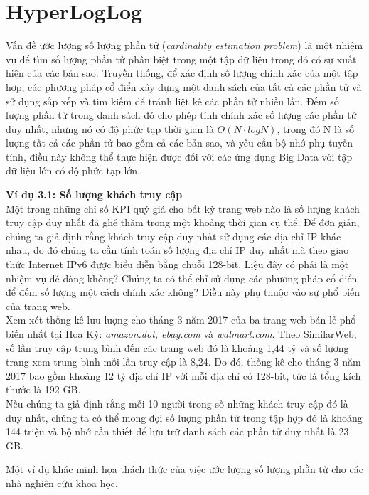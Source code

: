 \documentclass[a4paper,13pt]{article}
\theoremstyle{mytheor}
\begin{document}
\section{HyperLogLog}
Vấn đề ước lượng số lượng phần tử (\textit{cardinality estimation problem}) là một nhiệm vụ để tìm số lượng phần tử phân biệt 
trong một tập dữ liệu trong đó có sự xuất hiện của các bản sao. Truyền thống, 
để xác định số lượng chính xác của một tập hợp, các phương pháp cổ điển xây dựng 
một danh sách của tất cả các phần tử và sử dụng sắp xếp và tìm kiếm để tránh liệt kê 
các phần tử nhiều lần. Đếm số lượng phần tử trong danh sách đó cho phép tính chính xác 
số lượng các phần tử duy nhất, nhưng nó có độ phức tạp thời gian là $O(N\cdot logN)$, 
trong đó N là số lượng tất cả các phần tử bao gồm cả các bản sao, và yêu cầu 
bộ nhớ phụ tuyến tính, điều này không thể thực hiện được đối với các ứng dụng 
Big Data với tập dữ liệu lớn có độ phức tạp lớn.
\begin{mdframed}
   \textbf{Ví dụ 3.1: Số lượng khách truy cập}\\
    Một trong những chỉ số KPI quý giá cho bất kỳ trang web nào là số lượng khách truy cập duy nhất đã ghé thăm trong một khoảng thời gian cụ thể. 
    Để đơn giản, chúng ta giả định rằng khách truy cập duy nhất sử dụng các địa chỉ IP khác nhau, do đó chúng ta cần tính toán số lượng địa chỉ IP 
    duy nhất mà theo giao thức Internet IPv6 được biểu diễn bằng chuỗi 128-bit. Liệu đây có phải là một nhiệm vụ dễ dàng không? 
    Chúng ta có thể chỉ sử dụng các phương pháp cổ điển để đếm số lượng một cách chính xác không? Điều này phụ thuộc vào sự phổ biến của trang web.\\
    Xem xét thống kê lưu lượng cho tháng 3 năm 2017 của ba trang web bán lẻ phổ biến nhất tại Hoa Kỳ: \textit{amazon.dot, ebay.com} và 
    \textit{walmart.com}. Theo SimilarWeb, số lần truy cập trung bình đến các trang web đó là khoảng 1,44 tỷ và số lượng trang xem trung bình 
    mỗi lần truy cập là 8,24. Do đó, thống kê cho tháng 3 năm 2017 bao gồm khoảng 12 tỷ địa chỉ IP với mỗi địa chỉ có 128-bit, tức là tổng 
    kích thước là 192 GB.\\
    Nếu chúng ta giả định rằng mỗi 10 người trong số những khách truy cập đó là duy nhất, chúng ta có thể mong đợi số lượng phần tử 
    trong tập hợp đó là khoảng 144 triệu và bộ nhớ cần thiết để lưu trữ danh sách các phần tử duy nhất là 23 GB.
\end{mdframed}
\break
Một ví dụ khác minh họa thách thức của việc ước lượng số lượng phần tử 
cho các nhà nghiên cứu khoa học.
\end{document}
